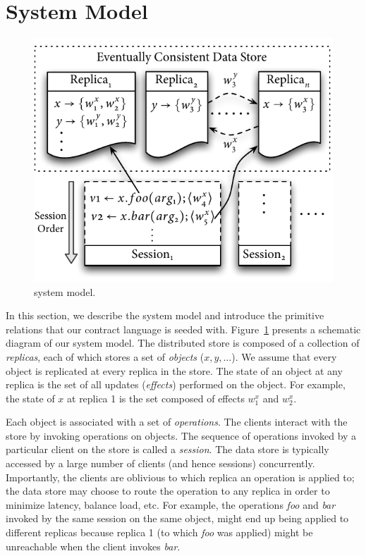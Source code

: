 \section{System Model}
\label{sec:sysmod}

\begin{figure}
\centering
\includegraphics[width=0.8\columnwidth]{Figures/SystemModel}
\caption{\name system model.}
\label{fig:sysmod}
\end{figure}

In this section, we describe the system model and introduce the primitive
relations that our contract language is seeded with. Figure~\ref{fig:sysmod}
presents a schematic diagram of our system model. The distributed store is
composed of a collection of \emph{replicas}, each of which stores a set of
\emph{objects} ($x,y,\ldots$). We assume that every object is replicated at
every replica in the store. The state of an object at any replica is the set of
all updates (\emph{effects}) performed on the object. For example, the state of
$x$ at replica 1 is the set composed of effects $w^x_1$ and $w^x_2$.

Each object is associated with a set of \emph{operations}. The clients interact
with the store by invoking operations on objects. The sequence of operations
invoked by a particular client on the store is called a \emph{session}. The
data store is typically accessed by a large number of clients (and hence
sessions) concurrently. Importantly, the clients are oblivious to which replica
an operation is applied to; the data store may choose to route the operation to
any replica in order to minimize latency, balance load, etc. For example, the
operations \emph{foo} and \emph{bar} invoked by the same session on the same
object, might end up being applied to different replicas because replica 1 (to
which \emph{foo} was applied) might be unreachable when the client invokes
\emph{bar}.

